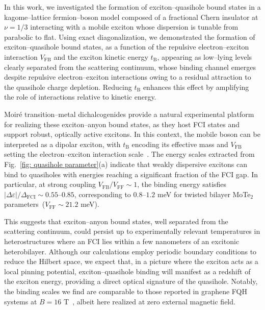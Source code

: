 \documentclass[aps,prl,twocolumn,amsmath,amssymb,nofootinbib,superscriptaddress,floatfix]{revtex4-1}
\begin{document}
{ In this work, we investigated the formation of exciton--quasihole bound states in a kagome--lattice fermion--boson model composed of a fractional Chern insulator at $\nu=1/3$ interacting with a mobile exciton whose dispersion is tunable from parabolic to flat. Using exact diagonalization,
we demonstrated the formation of exciton--quasihole bound states, as a function of the repulsive electron--exciton interaction $V_{\mathrm{FB}}$ and the exciton kinetic energy $t_{\mathrm{B}}$, appearing as low--lying levels clearly separated from the scattering continuum, whose binding channel emerges despite repulsive electron--exciton interactions owing to a residual attraction to the quasihole charge depletion. Reducing $t_{\mathrm{B}}$ enhances this effect by amplifying the role of interactions relative to kinetic energy.
}


{
Moir\'e transition--metal dichalcogenides provide a natural experimental platform for realizing these exciton--anyon bound states, as they host FCI states and support robust, optically active excitons. In this context, the mobile boson can be interpreted as a dipolar exciton, with $t_{\mathrm{B}}$ encoding its effective mass and $V_{\mathrm{FB}}$ setting the electron--exciton interaction scale~\cite{xiong2023correlated,park2023dipole,gao2024excitonic,lian2024valley,wang2023intercell}. The energy scales extracted from Fig.~\ref{fig: quasihole parameter}(a) indicate that weakly dispersive excitons can bind to quasiholes with energies reaching a significant fraction of the FCI gap. In particular, at strong coupling $V_{\text{FB}}/V_{\text{FF}} \sim 1$, the binding energy satisfies {$|\Delta \varepsilon|/\Delta_{\text{FCI}} \sim 0.55$--$0.85$, corresponding to $0.8$--$1.2$ meV} for twisted bilayer MoTe$_2$ parameters~($V_\text{FF}\sim 21.2$ meV).

This suggests that exciton--anyon bound states, well separated from the scattering continuum, could persist up to experimentally relevant temperatures in heterostructures where an FCI lies within a few nanometers of an excitonic heterobilayer. Although our calculations employ periodic boundary conditions to reduce the Hilbert space, we expect that, in a picture where the exciton acts as a local pinning potential, exciton--quasihole binding will manifest as a redshift of the exciton energy, providing a direct optical signature of the quasihole. Notably, the binding scales we find are comparable to those reported in graphene FQH systems at $B=16$ T~\cite{mostaan2025anyon}, albeit here realized at zero external magnetic field.
}
\end{document}
